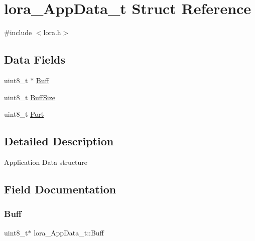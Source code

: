 \hypertarget{structlora__AppData__t}{}\section{lora\+\_\+\+App\+Data\+\_\+t Struct Reference}
\label{structlora__AppData__t}


{\ttfamily \#include $<$lora.\+h$>$}

\subsection*{Data Fields}
\begin{DoxyCompactItemize}
\item 
uint8\+\_\+t $\ast$ \hyperlink{structlora__AppData__t_ab35779bafa91eae413c99ba800903827}{Buff}
\item 
uint8\+\_\+t \hyperlink{structlora__AppData__t_afc0792ef22bfeff4a47d4bf41dfdeb50}{Buff\+Size}
\item 
uint8\+\_\+t \hyperlink{structlora__AppData__t_a5ec1eaaeb3098b35864ce2b7ebc4a348}{Port}
\end{DoxyCompactItemize}


\subsection{Detailed Description}
Application Data structure 

\subsection{Field Documentation}
\mbox{\label{structlora__AppData__t_ab35779bafa91eae413c99ba800903827}} 
\subsubsection{\texorpdfstring{Buff}{Buff}}
{\footnotesize\ttfamily uint8\+\_\+t$\ast$ lora\+\_\+\+App\+Data\+\_\+t\+::\+Buff}

\mbox{\label{structlora__AppData__t_afc0792ef22bfeff4a47d4bf41dfdeb50}} 

